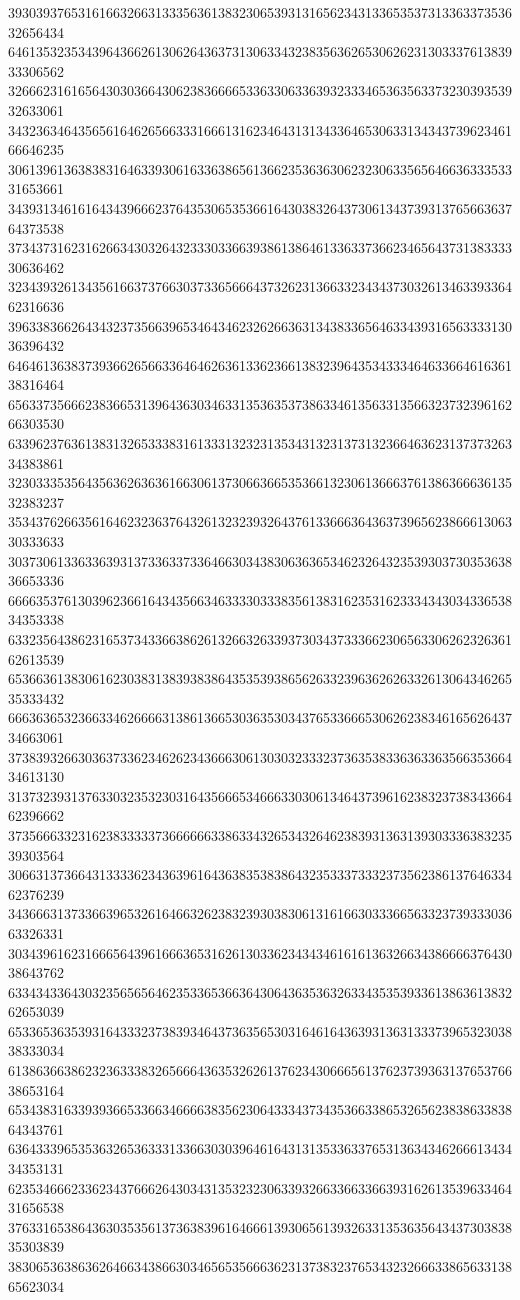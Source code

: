 39303937653161663266313335636138323065393131656234313365353731336337353632656434
64613532353439643662613062643637313063343238356362653062623130333761383933306562
32666231616564303036643062383666653363306336393233346536356337323039353932633061
34323634643565616462656633316661316234643131343364653063313434373962346166646235
30613961363838316463393061633638656136623536363062323063356564663633353331653661
34393134616164343966623764353065353661643038326437306134373931376566363764373538
37343731623162663430326432333033663938613864613363373662346564373138333330636462
32343932613435616637376630373365666437326231366332343437303261346339336462316636
39633836626434323735663965346434623262663631343833656463343931656333313036396432
64646136383739366265663364646263613362366138323964353433346463366461636138316464
65633735666238366531396436303463313536353738633461356331356632373239616266303530
63396237636138313265333831613331323231353431323137313236646362313737326334383861
32303335356435636263636166306137306636653536613230613666376138636663613532383237
35343762663561646232363764326132323932643761336663643637396562386661306330333633
30373061336336393137336337336466303438306363653462326432353930373035363836653336
66663537613039623661643435663463333033383561383162353162333434303433653834353338
63323564386231653734336638626132663263393730343733366230656330626232636162613539
65366361383061623038313839383864353539386562633239636262633261306434626535333432
66636365323663346266663138613665303635303437653366653062623834616562643734663061
37383932663036373362346262343666306130303233323736353833636336356635366434613130
31373239313763303235323031643566653466633030613464373961623832373834366462396662
37356663323162383333373666666338633432653432646238393136313930333638323539303564
30663137366431333362343639616436383538386432353337333237356238613764633462376239
34366631373366396532616466326238323930383061316166303336656332373933303663326331
30343961623166656439616663653162613033623434346161613632663438666637643038643762
63343433643032356565646235336536636430643635363263343535393361386361383262653039
65336536353931643332373839346437363565303164616436393136313337396532303838333034
61386366386232363338326566643635326261376234306665613762373936313765376638653164
65343831633939366533663466663835623064333437343536633865326562383863383864343761
63643339653536326536333133663030396461643131353363376531363434626661343434353131
62353466623362343766626430343135323230633932663366336639316261353963346431656538
37633165386436303535613736383961646661393065613932633135363564343730383835303839
38306536386362646634386630346565356663623137383237653432326663386563313865623034
